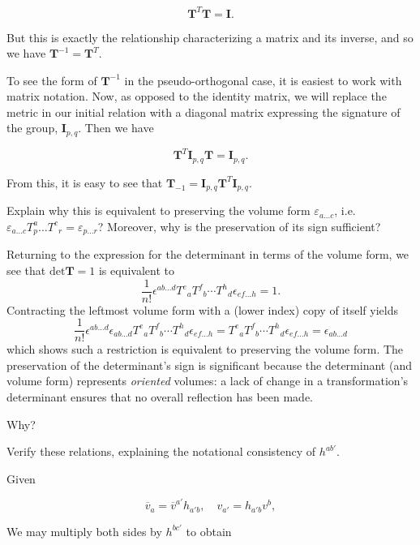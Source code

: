 \documentclass[../the-road-to-reality.tex]{subfiles}
\begin{document}
\begin{questions}
\begin{solution}
	\[
		\mathbf{T}^{T}\mathbf{T} = \mathbf{I}	
	.\]

	But this is exactly the relationship characterizing a matrix and its inverse, and so we have $\mathbf{T}^{-1} = \mathbf{T}^T$.

	To see the form of $\mathbf{T}^{-1}$ in the pseudo-orthogonal case, it is easiest to work with matrix notation. Now, as opposed to the identity matrix, we will replace the metric in our initial relation with a diagonal matrix expressing the signature of the group, $\mathbf{I}_{p,q}$. Then we have

	\[
		\mathbf{T}^T\mathbf{I}_{p,q}\mathbf{T} = \mathbf{I}_{p,q}	
	.\]

	From this, it is easy to see that $\mathbf{T}_{-1} = \mathbf{I}_{p,q}\mathbf{T}^T\mathbf{I}_{p,q}$.
\end{solution}

\question Explain why this is equivalent to preserving the volume form $\varepsilon_{a\dots{c}}$, i.e. $\varepsilon_{a\dots{c}}T^a_p\dots{T^c}_r = \varepsilon_{p\dots{r}}$? Moreover, why is the preservation of its sign sufficient?

\begin{solution}
	Returning to the expression for the determinant in terms of the volume form, we see that $\mathrm{det}\mathbf{T}=1$ is equivalent to
	\[
	\frac{1}{n!}\epsilon^{ab\dots{d}}{T^e}_a{T^f}_b\cdots{T^h}_d\epsilon_{ef\dots{h}} = 1.
	\] 
	Contracting the leftmost volume form with a (lower index) copy of itself yields
	\[
	\frac{1}{n!}\epsilon^{ab\dots{d}}\epsilon_{ab\dots{d}}{T^e}_a{T^f}_b\cdots{T^h}_d\epsilon_{ef\dots{h}} = {T^e}_a{T^f}_b\cdots{T^h}_d\epsilon_{ef\dots{h}} = \epsilon_{ab\dots{d}}
	\] 
	which shows such a restriction is equivalent to preserving the volume form. The preservation of the determinant's sign is significant because the determinant (and volume form) represents \textit{oriented} volumes: a lack of change in a transformation's determinant ensures that no overall reflection has been made.
\end{solution}

\question Why?

\question Verify these relations, explaining the notational consistency of $h^{ab'}$.

\begin{solution}
	Given 

	\[
		\overline{v}_a = \overline{v}^{a'}h_{a'b}, \quad v_{a'} = h_{a'b}v^b
	,\] 

	We may multiply both sides by $h^{bc'}$ to obtain


\end{solution}
\end{questions}
\end{document}
